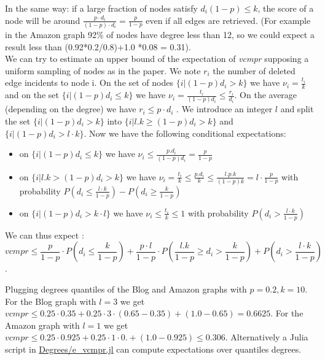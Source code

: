 \documentclass{article}
\begin{document}
In the same way: if a large fraction of nodes satisfy $ d_{i}(1-p) \leq k$, the score of a node will be around
$\frac{p \cdot d_{i}}{(1- p) \cdot d_{i}} = \frac{p}{1-p}$ even if all edges are retrieved.
(For example in the Amazon graph 92\% of nodes have degree less than 12, so we could expect a result less than (0.92*0.2/0.8)+1.0 *0.08 = 0.31).\\

We can try to estimate an upper bound of the expectation of \textit{vcmpr} supposing a uniform sampling of nodes as in the paper.
We note $r_{i}$ the number of deleted edge incidents to node i.
On the set of nodes $\{i | (1-p) d_{i} > k\}$ we have $ \nu_{i} = \frac{t_{i}}{k} $ and on the set $\{i |(1-p) d_{i} \leq k\}$  we have  $ \nu_{i} = \frac{t_{i}}{(1-p) d_{i}} \leq \frac{r_{i}}{d_{i}}$.
On the average (depending on the degree) we have $ r_{i} \leq p \cdot d_{i} $ . We introduce an integer $l$ and split the set $ \{ i | (1-p) d_{i} > k  \}$ into  $ \{ i | l . k \ge (1-p) d_{i} > k  \}$ and $ \{ i | (1-p) d_{i} > l \cdot k \}$. Now we have the following conditional expectations:
\begin{itemize}
    \item  on $\{i | (1-p) d_{i} \leq k\}$ we have $ \nu_{i} \leq \frac{p . d_{i}}{(1-p) d_{i}} = \frac{p}{1-p}$
    \item on  $ \{ i | l . k > (1-p) d_{i} > k  \}$ we have $ \nu_{i} = \frac{t_{i}}{k} \leq \frac{p.d_{i}}{k} \leq \frac{l.p.k}{(1-p) k} = l \cdot \frac{p}{1-p} $
          with probability $P(d_{i} \leq \frac{l \cdot k}{1-p}) - P(d_{i} \geq \frac{k}{1-p})$
    \item on $\{i| (1-p) d_{i} > k \cdot l \}$  we have $ \nu_{i} \leq \frac{t_{i}}{k} \leq 1 $ with probability $ P(d_{i} > \frac{l \cdot k}{1-p}) $
\end{itemize}

We can thus expect :
$$ vcmpr \leq \frac{p}{1-p} \cdot P(d_{i} \leq \frac{k}{1-p}) + \frac{p \cdot l}{1-p}  \cdot P(\frac{l . k}{1-p} \geq d_{i} > \frac{k}{1-p} ) + P(d_{i} > \frac{l \cdot k}{1-p})$$.

Plugging degrees quantiles of the Blog and Amazon graphs
with $p=0.2, k=10$. For the Blog graph with $l=3$ we get $vcmpr \leq  0.25 \cdot 0.35 + 0.25 \cdot 3 \cdot (0.65-0.35) + (1.0-0.65) = 0.6625$.
For the Amazon graph with $l = 1$ we get $ vcmpr \leq 0.25 \cdot 0.925 + 0.25 \cdot 1 \cdot 0. + (1.0-0.925) \leq 0.306$.
Alternatively a Julia script in \href{https://github.com/jean-pierreBoth/linkauc/tree/master/Degrees}{\color{blue}Degrees/e\_vcmpr.jl} can compute expectations over quantiles degrees.
\end{document}
